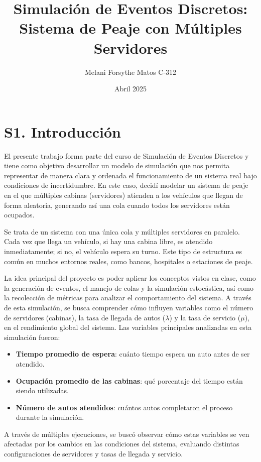 \documentclass[12pt]{article}
\title{Simulación de Eventos Discretos: Sistema de Peaje con Múltiples Servidores}
\author{Melani Forsythe Matos C-312}
\date{Abril 2025}
\begin{document}
\maketitle

\section*{S1. Introducción}

El presente trabajo forma parte del curso de Simulación de Eventos Discretos y tiene como objetivo desarrollar un modelo de simulación que nos permita representar de manera clara y ordenada el funcionamiento de un sistema real bajo condiciones de incertidumbre. En este caso, decidí modelar un sistema de peaje en el que múltiples cabinas (servidores) atienden a los vehículos que llegan de forma aleatoria, generando así una cola cuando todos los servidores están ocupados.

Se trata de un sistema con una única cola y múltiples servidores en paralelo. Cada vez que llega un vehículo, si hay una cabina libre, es atendido inmediatamente; si no, el vehículo espera su turno. Este tipo de estructura es común en muchos entornos reales, como bancos, hospitales o estaciones de peaje.

La idea principal del proyecto es poder aplicar los conceptos vistos en clase, como la generación de eventos, el manejo de colas y la simulación estocástica, así como la recolección de métricas para analizar el comportamiento del sistema. A través de esta simulación, se busca comprender cómo influyen variables como el número de servidores (cabinas), la tasa de llegada de autos ($\lambda$) y la tasa de servicio ($\mu$), en el rendimiento global del sistema.
Las variables principales analizadas en esta simulación fueron:
\begin{itemize}
  \item \textbf{Tiempo promedio de espera}: cuánto tiempo espera un auto antes de ser atendido.
  \item \textbf{Ocupación promedio de las cabinas}: qué porcentaje del tiempo están siendo utilizadas.
  \item \textbf{Número de autos atendidos}: cuántos autos completaron el proceso durante la simulación.
\end{itemize}

A través de múltiples ejecuciones, se buscó observar cómo estas variables se ven afectadas por los cambios en las condiciones del sistema, evaluando distintas configuraciones de servidores y tasas de llegada y servicio.
\end{document}
